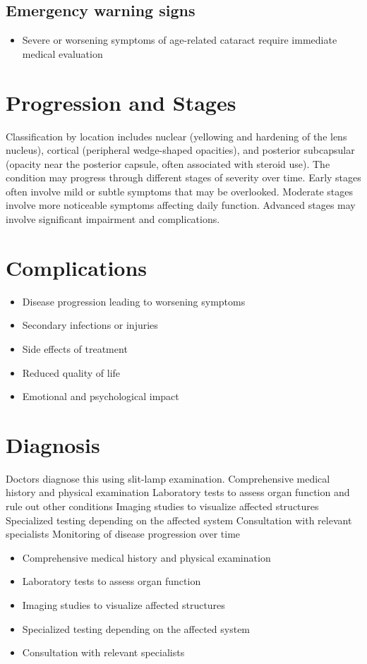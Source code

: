 \subsection{Emergency warning signs}
\begin{itemize}[noitemsep]
  \item Severe or worsening symptoms of age-related cataract require immediate medical evaluation
\end{itemize}
\section{Progression and Stages}
Classification by location includes nuclear (yellowing and hardening of the lens nucleus), cortical (peripheral wedge-shaped opacities), and posterior subcapsular (opacity near the posterior capsule, often associated with steroid use). The condition may progress through different stages of severity over time. Early stages often involve mild or subtle symptoms that may be overlooked. Moderate stages involve more noticeable symptoms affecting daily function. Advanced stages may involve significant impairment and complications.
\section{Complications}
\begin{itemize}[noitemsep]
  \item Disease progression leading to worsening symptoms
  \item Secondary infections or injuries
  \item Side effects of treatment
  \item Reduced quality of life
  \item Emotional and psychological impact
\end{itemize}
\section{Diagnosis}
Doctors diagnose this using slit-lamp examination. Comprehensive medical history and physical examination Laboratory tests to assess organ function and rule out other conditions Imaging studies to visualize affected structures Specialized testing depending on the affected system Consultation with relevant specialists Monitoring of disease progression over time

\begin{itemize}[noitemsep]
  \item Comprehensive medical history and physical examination
  \item Laboratory tests to assess organ function
  \item Imaging studies to visualize affected structures
  \item Specialized testing depending on the affected system
  \item Consultation with relevant specialists
\end{itemize}

